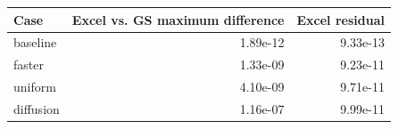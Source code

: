 \begin{tabular}{lrr}
\toprule
Case & Excel vs. GS maximum difference & Excel residual \\
\midrule
baseline & 1.89e-12 & 9.33e-13 \\
faster & 1.33e-09 & 9.23e-11 \\
uniform & 4.10e-09 & 9.71e-11 \\
diffusion & 1.16e-07 & 9.99e-11 \\
\bottomrule
\end{tabular}
